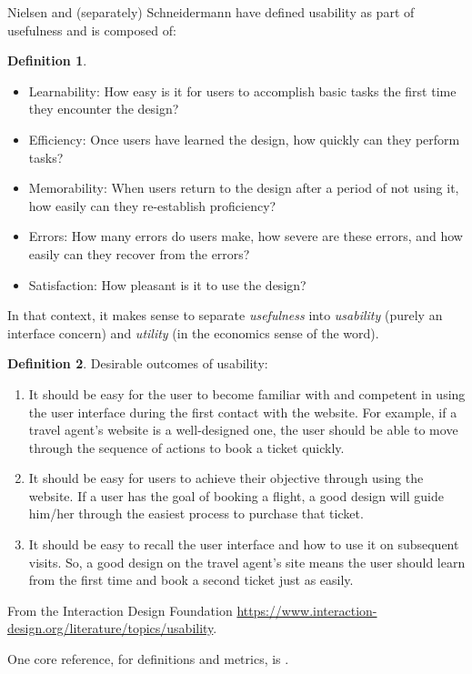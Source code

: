 \documentclass[letterpaper, cleveref]{lipics-v2019}
\theoremstyle{definition}
\newtheorem{defn}{Definition}
\begin{document}
Nielsen and (separately) Schneidermann have defined usability as part of
usefulness and is composed of:
\begin{defn}
\begin{itemize}
\item Learnability: How easy is it for users to accomplish basic tasks the first
  time they encounter the design?
\item Efficiency: Once users have learned the design, how quickly can they
  perform tasks?
\item Memorability: When users return to the design after a period of not using
  it, how easily can they re-establish proficiency?
\item Errors: How many errors do users make, how severe are these errors, and
  how easily can they recover from the errors?
\item Satisfaction: How pleasant is it to use the design?
\end{itemize}
In that context, it makes sense to separate \emph{usefulness} into
\emph{usability} (purely an interface concern) and \emph{utility} (in the
economics sense of the word).
\cite{NielsenNorman} %
\end{defn}

\begin{defn}
Desirable outcomes of usability:
\begin{enumerate}
\item It should be easy for the user to become familiar with and competent in
using the user interface during the first contact with the website. For
example, if a travel agent's website is a well-designed one, the user should
be able to move through the sequence of actions to book a ticket quickly.
\item It should be easy for users to achieve their objective through using the
  website. If a user has the goal of booking a flight, a good design will guide
  him/her through the easiest process to purchase that ticket.
\item It should be easy to recall the user interface and how to use it on
  subsequent visits. So, a good design on the travel agent's site means the user
  should learn from the first time and book a second ticket just as easily.
\end{enumerate}
From the Interaction Design Foundation
\url{https://www.interaction-design.org/literature/topics/usability}.
\end{defn}

One core reference, for definitions and metrics, is
\citet{bevan1995measuring}.
\end{document}

